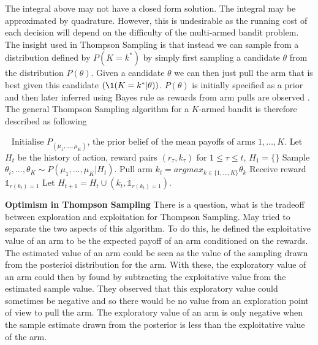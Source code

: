 The integral above may not have a closed form solution. The integral may be approximated by quadrature. However, this is undesirable as the running cost of each decision will depend on the difficulty of the multi-armed bandit problem. The insight used in Thompson Sampling is that instead we can sample from a distribution defined by $P(K=k^{\ast})$ by simply first sampling a candidate $\theta$ from the distribution $P(\theta)$. 
Given a candidate $\theta$ we can then just pull the arm that is best given this candidate $(\1(K=k^{\ast}|\theta))$. $P(\theta)$ is initially specified as  a prior and then later inferred using Bayes rule as rewards from arm pulls are observed . The general Thompson Sampling algorithm for a $K$-armed bandit is therefore described as following
\begin{algo}
\label{algo:thompson1}
\begin{algorithmic}
\STATE $\ \ $
\STATE Initialise $P_{(\mu_1,\dots,\mu_K)}$, the prior belief of the mean payoffs of arms $1,\dots,K$. 
\STATE Let $H_t$ be the history of action, reward pairs $(r_{\tau}, k_{\tau})$ for $1\leqslant \tau \leqslant t$, $H_1 = \{ \}$
	\STATE Sample $\theta_i,\dots,\theta_K \sim P(\mu_1,\dots,\mu_K|H_t)$.
    \STATE Pull arm $k_t = argmax_{k \in \{1,\dots,K\}} \theta_k$
    \STATE Receive reward $\mathds{1}_{r(k_t)=1}$
	\STATE Let $H_{t+1} = H_t \cup (k_t,\mathds{1}_{r(k_t)=1})$.
\ENDFOR
\end{algorithmic}
\end{algo}


\textbf{Optimism in Thompson Sampling}
There is a question, what is the tradeoff between exploration and exploitation for Thompson Sampling. May \cite{may2012optimistic} tried to separate the two aspects of this algorithm. To do this, he defined the exploitative value of an arm to be the expected payoff of an arm conditioned on the rewards. The estimated value of an arm could be seen as the value of the sampling drawn from the posterioi distribution for the arm. With these, the exploratory value of an arm could then by found by subtracting the exploitative value from the estimated sample value. They observed that this exploratory value could sometimes be negative and so there would be no value from an exploration point of view to pull the arm. The exploratory value of an arm is only negative when the sample estimate drawn from the posterior is less than the exploitative value of the arm. 

